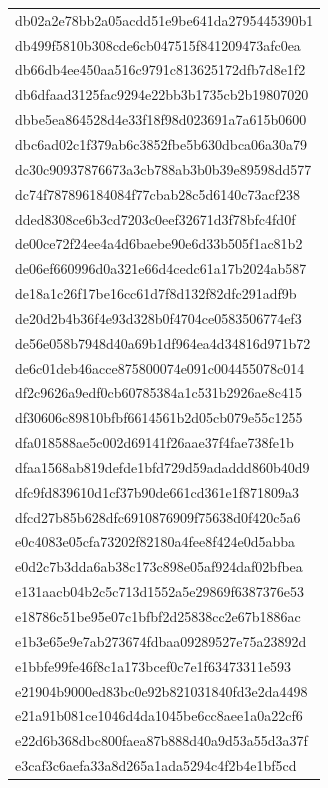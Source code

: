 \begin{tabular}{l}
db02a2e78bb2a05acdd51e9be641da2795445390b1 \\
db499f5810b308cde6cb047515f841209473afc0ea \\
db66db4ee450aa516c9791c813625172dfb7d8e1f2 \\
db6dfaad3125fac9294e22bb3b1735cb2b19807020 \\
dbbe5ea864528d4e33f18f98d023691a7a615b0600 \\
dbc6ad02c1f379ab6c3852fbe5b630dbca06a30a79 \\
dc30c90937876673a3cb788ab3b0b39e89598dd577 \\
dc74f787896184084f77cbab28c5d6140c73acf238 \\
dded8308ce6b3cd7203c0eef32671d3f78bfc4fd0f \\
de00ce72f24ee4a4d6baebe90e6d33b505f1ac81b2 \\
de06ef660996d0a321e66d4cedc61a17b2024ab587 \\
de18a1c26f17be16cc61d7f8d132f82dfc291adf9b \\
de20d2b4b36f4e93d328b0f4704ce0583506774ef3 \\
de56e058b7948d40a69b1df964ea4d34816d971b72 \\
de6c01deb46acce875800074e091c004455078c014 \\
df2c9626a9edf0cb60785384a1c531b2926ae8c415 \\
df30606c89810bfbf6614561b2d05cb079e55c1255 \\
dfa018588ae5c002d69141f26aae37f4fae738fe1b \\
dfaa1568ab819defde1bfd729d59adaddd860b40d9 \\
dfc9fd839610d1cf37b90de661cd361e1f871809a3 \\
dfcd27b85b628dfc6910876909f75638d0f420c5a6 \\
e0c4083e05cfa73202f82180a4fee8f424e0d5abba \\
e0d2c7b3dda6ab38c173c898e05af924daf02bfbea \\
e131aacb04b2c5c713d1552a5e29869f6387376e53 \\
e18786c51be95e07c1bfbf2d25838cc2e67b1886ac \\
e1b3e65e9e7ab273674fdbaa09289527e75a23892d \\
e1bbfe99fe46f8c1a173bcef0c7e1f63473311e593 \\
e21904b9000ed83bc0e92b821031840fd3e2da4498 \\
e21a91b081ce1046d4da1045be6cc8aee1a0a22cf6 \\
e22d6b368dbc800faea87b888d40a9d53a55d3a37f \\
e3caf3c6aefa33a8d265a1ada5294c4f2b4e1bf5cd \\

\end{tabular}
